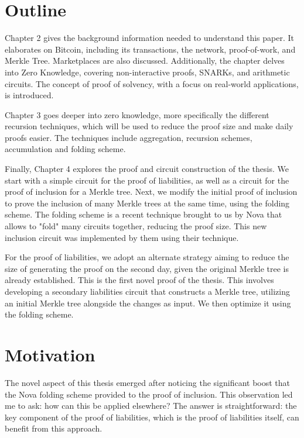 \section{Outline}

Chapter 2 gives the background information needed to understand this paper.
It elaborates on Bitcoin, including its transactions, the network, proof-of-work, and Merkle Tree. Marketplaces are also discussed. 
Additionally, the chapter delves into Zero Knowledge, covering non-interactive proofs, SNARKs, and arithmetic circuits.
The concept of proof of solvency, with a focus on real-world applications, is introduced. 

Chapter 3 goes deeper into zero knowledge, more specifically the different recursion techniques, which will be used to reduce the proof size and make 
daily proofs easier.
The techniques include aggregation, recursion schemes, accumulation and folding scheme.

Finally, Chapter 4 explores the proof and circuit construction of the thesis.
We start with a simple circuit for the proof of liabilities, as well as a circuit for the proof of inclusion for a Merkle tree.
Next, we modify the initial proof of inclusion to prove the inclusion of many Merkle trees at the same time, using the folding scheme.
The folding scheme is a recent technique brought to us by Nova that allows to "fold" many circuits together, reducing the proof size. 
This new inclusion circuit was implemented by them using their technique.

For the proof of liabilities, we adopt an alternate strategy aiming to reduce the size of generating the proof on the second day, 
given the original Merkle tree is already established. This is the first novel proof of the thesis.
This involves developing a secondary liabilities circuit that constructs a Merkle tree, utilizing an initial Merkle tree alongside the changes as input.
We then optimize it using the folding scheme.


\section{Motivation}
The novel aspect of this thesis emerged after noticing the significant boost that the Nova folding scheme provided
to the proof of inclusion. This observation led me to ask: how can this be applied elsewhere? The answer is straightforward: the key component of the proof of liabilities, 
which is the proof of liabilities itself, can benefit from this approach.

